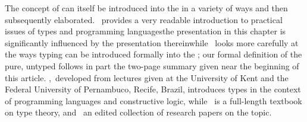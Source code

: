 The concept of  can itself be introduced into the \lambdacalc in a variety of ways and then subsequently elaborated. \citet{Cardelli:On-understanding:1985}~provides a very readable introduction to practical issues of types and programming languages\empause the presentation in this chapter is significantly influenced by the presentation therein\empause while \citet{Barendregt:Types:1990}~looks more carefully at the ways typing can be introduced formally into the \lambdacalc{}; our formal definition of the pure, untyped \lambdacalc follows in part the two-page summary given near the beginning of this article. \citet{Thompson:Type:1991},~developed from lectures given at the University of Kent and the Federal University of Pernambuco, Recife, Brazil, introduces types in the context of programming languages and constructive logic, while \citet{Pierce:Types:2002}~is a full-length textbook on type theory, and \citet{Pierce:Advanced:2005}~an edited collection of research papers on the topic.
